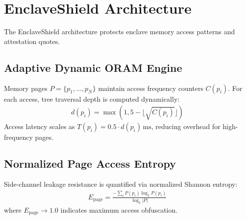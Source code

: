 \section{EnclaveShield Architecture}
\label{sec:methodology}

The EnclaveShield architecture protects enclave memory access patterns and attestation quotes.

\subsection{Adaptive Dynamic ORAM Engine}
Memory pages $P = \{p_1, \dots, p_N\}$ maintain access frequency counters $C(p_i)$. For each access, tree traversal depth is computed dynamically:
\begin{align}
    d(p_i) = \max\left(1, 5 - \lfloor\sqrt{C(p_i)}\rfloor\right)
\end{align}
Access latency scales as $T(p_i) = 0.5 \cdot d(p_i)\,\text{ms}$, reducing overhead for high-frequency pages.

\subsection{Normalized Page Access Entropy}
Side-channel leakage resistance is quantified via normalized Shannon entropy:
\begin{align}
    E_{\text{page}} = \frac{-\sum_{i} P(p_i) \log_2 P(p_i)}{\log_2 |P|}
\end{align}
where $E_{\text{page}} \to 1.0$ indicates maximum access obfuscation.
